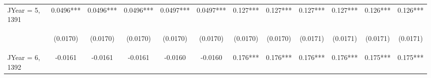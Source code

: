 \documentclass[]{article}
\begin{document}
\begin{center}
\begin{tabular}{lccccccccccc}
JYear = 5, 1391 & 0.0496*** & 0.0496*** & 0.0496*** & 0.0497*** & 0.0497*** & 0.127*** & 0.127*** & 0.127*** & 0.127*** & 0.126*** & 0.126*** \\
\vspace{4pt} & \begin{footnotesize}(0.0170)\end{footnotesize} & \begin{footnotesize}(0.0170)\end{footnotesize} & \begin{footnotesize}(0.0170)\end{footnotesize} & \begin{footnotesize}(0.0170)\end{footnotesize} & \begin{footnotesize}(0.0170)\end{footnotesize} & \begin{footnotesize}(0.0170)\end{footnotesize} & \begin{footnotesize}(0.0170)\end{footnotesize} & \begin{footnotesize}(0.0171)\end{footnotesize} & \begin{footnotesize}(0.0171)\end{footnotesize} & \begin{footnotesize}(0.0171)\end{footnotesize} & \begin{footnotesize}(0.0171)\end{footnotesize} \\
JYear = 6, 1392 & -0.0161 & -0.0161 & -0.0161 & -0.0160 & -0.0160 & 0.176*** & 0.176*** & 0.176*** & 0.176*** & 0.175*** & 0.175*** \\

\end{tabular}
\end{center}
\end{document}
